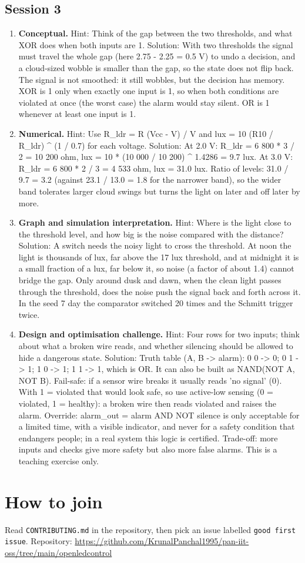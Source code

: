 \documentclass[11pt,a4paper]{article}
\begin{document}
\subsection*{Session 3}
\begin{enumerate}[nosep]
\item \textbf{Conceptual.} Hint: Think of the gap between the two thresholds, and what XOR does when both inputs are 1. Solution: With two thresholds the signal must travel the whole gap (here 2.75 - 2.25 = 0.5 V) to undo a decision, and a cloud-sized wobble is smaller than the gap, so the state does not flip back. The signal is not smoothed: it still wobbles, but the decision has memory. XOR is 1 only when exactly one input is 1, so when both conditions are violated at once (the worst case) the alarm would stay silent. OR is 1 whenever at least one input is 1.
\item \textbf{Numerical.} Hint: Use R\_ldr = R (Vcc - V) / V and lux = 10 (R10 / R\_ldr) \textasciicircum{} (1 / 0.7) for each voltage. Solution: At 2.0 V: R\_ldr = 6 800 * 3 / 2 = 10 200 ohm, lux = 10 * (10 000 / 10 200) \textasciicircum{} 1.4286 = 9.7 lux. At 3.0 V: R\_ldr = 6 800 * 2 / 3 = 4 533 ohm, lux = 31.0 lux. Ratio of levels: 31.0 / 9.7 = 3.2 (against 23.1 / 13.0 = 1.8 for the narrower band), so the wider band tolerates larger cloud swings but turns the light on later and off later by more.
\item \textbf{Graph and simulation interpretation.} Hint: Where is the light close to the threshold level, and how big is the noise compared with the distance? Solution: A switch needs the noisy light to cross the threshold. At noon the light is thousands of lux, far above the 17 lux threshold, and at midnight it is a small fraction of a lux, far below it, so noise (a factor of about 1.4) cannot bridge the gap. Only around dusk and dawn, when the clean light passes through the threshold, does the noise push the signal back and forth across it. In the seed 7 day the comparator switched 20 times and the Schmitt trigger twice.
\item \textbf{Design and optimisation challenge.} Hint: Four rows for two inputs; think about what a broken wire reads, and whether silencing should be allowed to hide a dangerous state. Solution: Truth table (A, B -\textgreater{} alarm): 0 0 -\textgreater{} 0; 0 1 -\textgreater{} 1; 1 0 -\textgreater{} 1; 1 1 -\textgreater{} 1, which is OR. It can also be built as NAND(NOT A, NOT B). Fail-safe: if a sensor wire breaks it usually reads 'no signal' (0). With 1 = violated that would look safe, so use active-low sensing (0 = violated, 1 = healthy): a broken wire then reads violated and raises the alarm. Override: alarm\_out = alarm AND NOT silence is only acceptable for a limited time, with a visible indicator, and never for a safety condition that endangers people; in a real system this logic is certified. Trade-off: more inputs and checks give more safety but also more false alarms. This is a teaching exercise only.
\end{enumerate}

\section{How to join}
Read \texttt{CONTRIBUTING.md} in the repository, then pick an issue labelled \texttt{good first issue}. Repository: \url{https://github.com/KrunalPanchal1995/pan-iit-oss/tree/main/openledcontrol}
\end{document}
